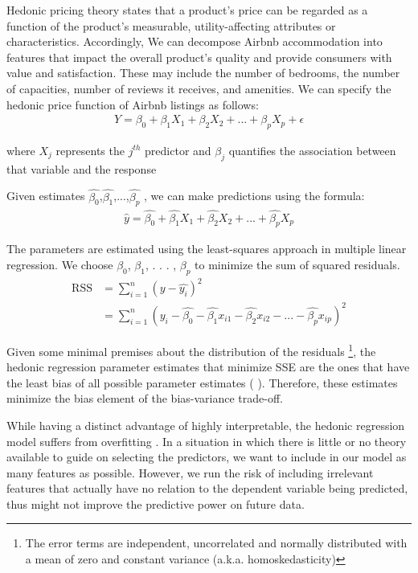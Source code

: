 Hedonic pricing theory states that a product's price can be regarded as a
function of the product's measurable, utility-affecting attributes or
characteristics.  Accordingly, We can decompose Airbnb accommodation into
features that impact the overall product's quality and provide consumers with
value and satisfaction.  These may include the number of bedrooms, the number of
capacities, number of reviews it receives, and amenities.
We can specify the hedonic price function of Airbnb listings as follows:
\begin{eqnarray}
    Y = \beta_0 + \beta_1 X_1 + \beta_2 X_2 + ... + \beta_p X_p + \epsilon
\end{eqnarray}

where $X_j$ represents the $j^{th}$ predictor and $\beta_j$ quantifies the
association between that variable and the response

Given estimates $\hat{\beta_0}$,$\hat{\beta_1}$,...,$\hat{\beta_p}$ , we can
make predictions using the formula:
\begin{eqnarray}
  \hat{y} = \hat{\beta_0} + \hat{\beta_1} X_1 + \hat{\beta_2} X_2 + ... + \hat{\beta_p} X_p
\end{eqnarray}

The parameters are estimated using the least-squares approach in multiple linear
regression. We choose $\beta_0$, $\beta_1$, . . . , $\beta_p$ to minimize the
sum of squared residuals.
\begin{equation}
\begin{split}
\textrm{RSS} & = \sum_{i=1}^{n}(y-\hat{y_i})^2 \\
   & =\sum_{i=1}^{n}(y_i - \hat{\beta_0} - \hat{\beta_1} x_{i1} - \hat{\beta_2} x_{i2} - ... - \hat{\beta_p} x_{ip})^2
\end{split}
\end{equation}

Given some minimal premises about the distribution of the residuals \footnote{
The error terms are independent, uncorrelated and normally distributed with a
mean of zero and constant variance  (a.k.a. homoskedasticity)}, the hedonic
regression parameter estimates that
minimize SSE are the ones that have the least bias of all possible parameter
estimates (\textcite{graybill1976theory} ). Therefore, these estimates minimize
the bias element of the bias-variance trade-off.

While having a distinct advantage of highly interpretable, the hedonic
regression model suffers from overfitting \parencite{harrell2015regression}.
In a situation in which  there is little or no theory available to guide on
selecting the predictors, we want to include in our model as many features as
possible.  However, we run the risk of including irrelevant features that
actually have no relation to the dependent variable being predicted, thus might
not improve the predictive power on future data.

